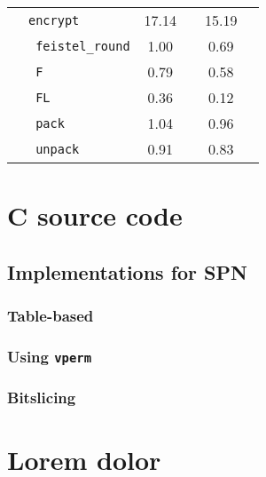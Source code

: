 \begin{table}[!htpb]
\begin{tabular}{llcccc}
                                                & \texttt{encrypt} & 17.14 & & 15.19 & \\
        \cmidrule(lr){2-2}
                                                & \texttt{ feistel\_round} & 1.00 & & 0.69 & \\
                                                & \texttt{ F} & 0.79 & & 0.58 & \\
                                                & \texttt{ FL} & 0.36 & & 0.12 & \\
                                                & \texttt{ pack} & 1.04 & & 0.96 & \\
                                                & \texttt{ unpack} & 0.91 & & 0.83 & \\
        \bottomrule
    \end{tabular}
\end{table}

\chapter{C source code}
\label{app:cimpl}

\section{Implementations for SPN}
\subsection{Table-based}




\subsection{Using \texttt{vperm}}




\subsection{Bitslicing}




\chapter{Lorem dolor}
